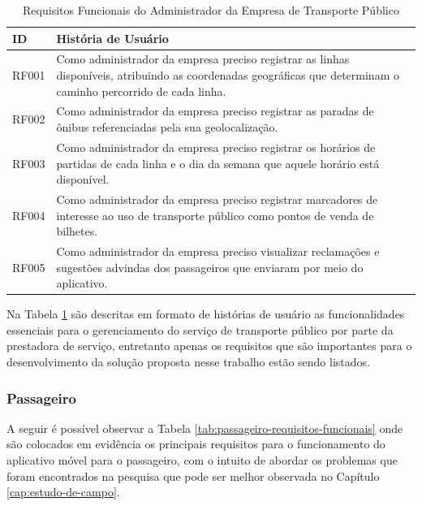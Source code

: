{\renewcommand{\arraystretch}{2}
\begin{table}[H]
\centering
\caption{Requisitos Funcionais do Administrador da Empresa de Transporte Público}
\label{tab:empresa-requisitos-funcionais}
\begin{tabular}{ l | p{13.5cm} }
\hline
\textbf{ID} & \textbf{História de Usuário} \\
\hline
RF001 & Como administrador da empresa preciso registrar as linhas disponíveis, atribuindo as coordenadas geográficas que determinam o caminho percorrido de cada linha.\\ \hline
RF002 & Como administrador da empresa preciso registrar as paradas de ônibus referenciadas pela sua geolocalização. \\ \hline
RF003 & Como administrador da empresa preciso registrar os horários de partidas de cada linha e o dia da semana que aquele horário está disponível. \\ \hline
RF004 & Como administrador da empresa preciso registrar marcadores de interesse ao uso de transporte público como pontos de venda de bilhetes. \\ \hline
RF005 & Como administrador da empresa preciso visualizar reclamações e sugestões advindas dos passageiros que enviaram por meio do aplicativo. \\ \hline
\end{tabular}
\end{table}

Na Tabela \ref{tab:empresa-requisitos-funcionais} são descritas em formato de histórias de usuário as funcionalidades essenciais para o gerenciamento do serviço de transporte público por parte da prestadora de serviço, entretanto apenas os requisitos que são importantes para o desenvolvimento da solução proposta nesse trabalho estão sendo listados.

\subsubsection*{Passageiro}

A seguir é possível observar a Tabela \ref{tab:passageiro-requisitos-funcionais} onde são colocados em evidência os principais requisitos para o funcionamento do aplicativo móvel para o passageiro, com o intuito de abordar os problemas que foram encontrados na pesquisa que pode ser melhor observada no Capítulo \ref{cap:estudo-de-campo}.

}
